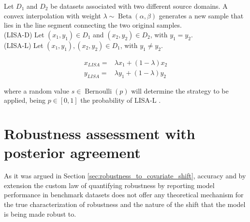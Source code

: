 \begin{definition}[LISA]
    Let $D_1$ and $D_2$ be datasets associated with two different source domains.
    A convex interpolation with weight $\lambda \sim \operatorname{Beta}(\alpha, \beta)$ 
    generates a new sample that lies in the 
    line segment connecting the two original samples. \\

    \vspace{-3.0mm}
    (LISA-D) Let $(x_1, y_1) \in D_1$ and $(x_2, y_2) \in D_2$, with $y_1 = y_2$. \\
    (LISA-L) Let $(x_1, y_1), (x_2, y_2) \in D_1$, with $y_1 \neq y_2$.
    \vspace{-1.0mm}

    $$
        \begin{aligned}
            x_{LISA} = & \lambda x_1 + (1 - \lambda) x_2 \\
            y_{LISA} = & \lambda y_1 + (1 - \lambda) y_2
        \end{aligned}
    $$

    where a random value $s \in \operatorname{Bernoulli}(p)$ will determine
    the strategy to be applied, being $p \in [0,1]$ the probability of LISA-L
    \cite{yaoImprovingOutofDistributionRobustness2022}.
\end{definition}


\section{Robustness assessment with posterior agreement}

As it was argued in Section \ref{sec:robustness_to_covariate_shift}, accuracy and
by extension the custom law of quantifying robustness by reporting
model performance in benchmark datasets does not offer any theoretical
mechanism for the true characterization of robustness and the nature of
the shift that the model is being made robust to. \\

